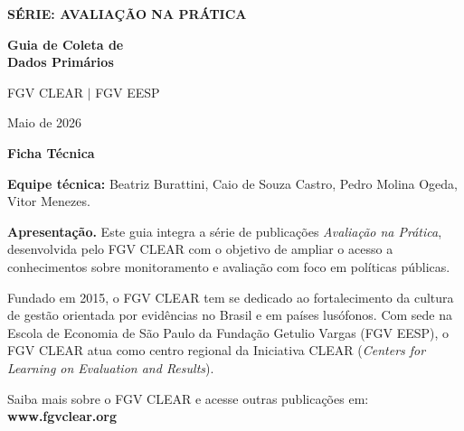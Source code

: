 \documentclass[12pt, a4paper, openany]{book}
\begin{document}
\thispagestyle{empty}
\begin{center}
\vspace*{3cm}

{\Large\bfseries\color{clearlightblue} S\'ERIE: AVALIA\c{C}\~AO NA PR\'ATICA}

\vspace{1.8cm}

{\Huge\bfseries\color{clearblue} Guia de Coleta de\\[0.3cm]
Dados Prim\'arios}

\vspace{2.2cm}

{\large FGV CLEAR $|$ FGV EESP}

\vspace{0.5cm}

{\large Maio de 2026}

\vfill
\end{center}
\newpage

\thispagestyle{empty}
\vspace*{1.5cm}

{\Large\bfseries\color{clearblue} Ficha T\'ecnica}

\bigskip

\noindent\textbf{Equipe t\'ecnica:} Beatriz Burattini, Caio de Souza Castro, Pedro Molina Ogeda, Vitor Menezes.

\bigskip

\noindent\textbf{Apresenta\c{c}\~ao.} Este guia integra a s\'erie de publica\c{c}\~oes \textit{Avalia\c{c}\~ao na Pr\'atica}, desenvolvida pelo FGV CLEAR com o objetivo de ampliar o acesso a conhecimentos sobre monitoramento e avalia\c{c}\~ao com foco em pol\'iticas p\'ublicas.

\medskip

\noindent Fundado em 2015, o FGV CLEAR tem se dedicado ao fortalecimento da cultura de gest\~ao orientada por evid\^encias no Brasil e em pa\'ises lus\'ofonos. Com sede na Escola de Economia de S\~ao Paulo da Funda\c{c}\~ao Getulio Vargas (FGV EESP), o FGV CLEAR atua como centro regional da Iniciativa CLEAR (\textit{Centers for Learning on Evaluation and Results}).

\medskip

\noindent Saiba mais sobre o FGV CLEAR e acesse outras publica\c{c}\~oes em: \textbf{www.fgvclear.org}
\end{document}
